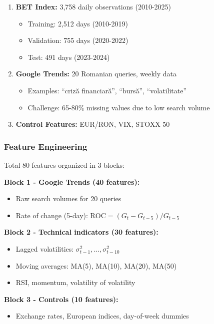 \documentclass[12pt,a4paper]{article}
\begin{document}
\begin{enumerate}
    \item \textbf{BET Index:} 3,758 daily observations (2010-2025)
    \begin{itemize}
        \item Training: 2,512 days (2010-2019)
        \item Validation: 755 days (2020-2022)
        \item Test: 491 days (2023-2024)
    \end{itemize}
    
    \item \textbf{Google Trends:} 20 Romanian queries, weekly data
    \begin{itemize}
        \item Examples: ``criză financiară'', ``bursă'', ``volatilitate''
        \item Challenge: 65-80\% missing values due to low search volume
    \end{itemize}
    
    \item \textbf{Control Features:} EUR/RON, VIX, STOXX 50
\end{enumerate}

\subsubsection{Feature Engineering}

Total 80 features organized in 3 blocks:

\textbf{Block 1 - Google Trends (40 features):}
\begin{itemize}
    \item Raw search volumes for 20 queries
    \item Rate of change (5-day): $\text{ROC} = (G_t - G_{t-5}) / G_{t-5}$
\end{itemize}

\textbf{Block 2 - Technical indicators (30 features):}
\begin{itemize}
    \item Lagged volatilities: $\sigma_{t-1}^2, \ldots, \sigma_{t-10}^2$
    \item Moving averages: MA(5), MA(10), MA(20), MA(50)
    \item RSI, momentum, volatility of volatility
\end{itemize}

\textbf{Block 3 - Controls (10 features):}
\begin{itemize}
    \item Exchange rates, European indices, day-of-week dummies
\end{itemize}
\end{document}
